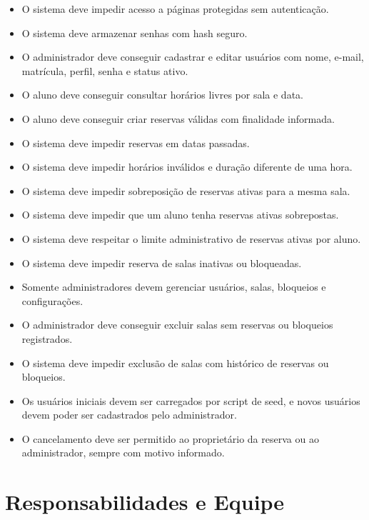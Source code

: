 \documentclass[12pt,a4paper]{article}
\begin{document}
\begin{itemize}
    \item O sistema deve impedir acesso a páginas protegidas sem autenticação.
    \item O sistema deve armazenar senhas com hash seguro.
    \item O administrador deve conseguir cadastrar e editar usuários com nome, e-mail, matrícula, perfil, senha e status ativo.
    \item O aluno deve conseguir consultar horários livres por sala e data.
    \item O aluno deve conseguir criar reservas válidas com finalidade informada.
    \item O sistema deve impedir reservas em datas passadas.
    \item O sistema deve impedir horários inválidos e duração diferente de uma hora.
    \item O sistema deve impedir sobreposição de reservas ativas para a mesma sala.
    \item O sistema deve impedir que um aluno tenha reservas ativas sobrepostas.
    \item O sistema deve respeitar o limite administrativo de reservas ativas por aluno.
    \item O sistema deve impedir reserva de salas inativas ou bloqueadas.
    \item Somente administradores devem gerenciar usuários, salas, bloqueios e configurações.
    \item O administrador deve conseguir excluir salas sem reservas ou bloqueios registrados.
    \item O sistema deve impedir exclusão de salas com histórico de reservas ou bloqueios.
    \item Os usuários iniciais devem ser carregados por script de seed, e novos usuários devem poder ser cadastrados pelo administrador.
    \item O cancelamento deve ser permitido ao proprietário da reserva ou ao administrador, sempre com motivo informado.
\end{itemize}

\section{Responsabilidades e Equipe}
\end{document}
